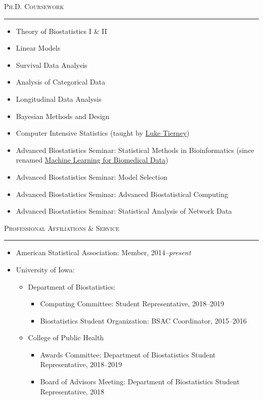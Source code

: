 \documentclass[a4paper]{article}
\begin{document}
\begin{flushleft}
  \Large\textsc{Ph.D. Coursework}
  \textcolor{usafagrey}{\rule[0.5\baselineskip]{\textwidth}{0.75pt}}
\end{flushleft}
\vspace{-1.5\baselineskip}

\begin{itemize}
  \item Theory of Biostatistics I \& II
  \item Linear Models
  \item Survival Data Analysis
  \item Analysis of Categorical Data
  \item Longitudinal Data Analysis
  \item Bayesian Methods and Design
  \item Computer Intensive Statistics (taught by \href{http://homepage.divms.uiowa.edu/~luke/}{Luke Tierney})
  \item Advanced Biostatistics Seminar: Statistical Methods in Bioinformatics
    (since renamed \href{https://myui.uiowa.edu/my-ui/courses/details.page?id=908172&ci=170989}{Machine Learning for Biomedical Data})
  \item Advanced Biostatistics Seminar: Model Selection
  \item Advanced Biostatistics Seminar: Advanced Biostatistical Computing
  \item Advanced Biostatistics Seminar: Statistical Analysis of Network Data
\end{itemize}


\begin{flushleft}
  \Large\textsc{Professional Affiliations \& Service}
  \textcolor{usafagrey}{\rule[0.5\baselineskip]{\textwidth}{0.75pt}}
\end{flushleft}
\vspace{-1.5\baselineskip}

\begin{itemize}
  \item American Statistical Association: Member, 2014--\textit{present}
  \item University of Iowa:
  \begin{itemize}
    \item Department of Biostatistics:
    \begin{itemize}
      \item Computing Committee: Student Representative, 2018--2019
      \item Biostatistics Student Organization: BSAC Coordinator, 2015--2016
    \end{itemize}
    \item College of Public Health
    \begin{itemize}
      \item Awards Committee: Department of Biostatistics Student Representative, 2018--2019
      \item Board of Advisors Meeting: Department of Biostatistics Student Representative, 2018
    \end{itemize}
  \end{itemize}
\end{itemize}
\end{document}

